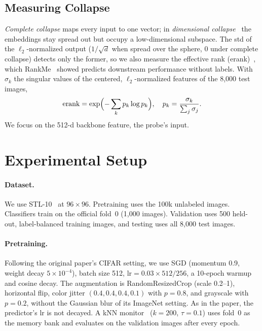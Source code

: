 \documentclass[10pt,twocolumn,letterpaper]{article}
\begin{document}
\subsection{Measuring Collapse}
\emph{Complete collapse} maps every input to one vector; in \emph{dimensional collapse}~\cite{hua2021feature,jing2022dimensional} the embeddings stay spread out but occupy a low-dimensional subspace.
The std of the $\ell_2$-normalized output ($1/\sqrt{d}$ when spread over the sphere, $0$ under complete collapse) detects only the former, so we also measure the effective rank (erank)~\cite{roy2007erank}, which RankMe~\cite{garrido2023rankme} showed predicts downstream performance without labels.
With $\sigma_k$ the singular values of the centered, $\ell_2$-normalized features of the 8,000 test images,
\begin{equation}
\text{erank}=\exp\Bigl(-\sum_k p_k\log p_k\Bigr),\quad p_k=\frac{\sigma_k}{\sum_j\sigma_j}.
\end{equation}
We focus on the 512-d backbone feature, the probe's input.

\section{Experimental Setup}
\label{sec:setup}

\paragraph{Dataset.}
We use STL-10~\cite{coates2011stl10} at $96\times96$. Pretraining uses the 100k unlabeled images.
Classifiers train on the official fold~0 (1,000 images). Validation uses 500 held-out, label-balanced training images, and testing uses all 8,000 test images.

\paragraph{Pretraining.}
Following the original paper's CIFAR setting, we use SGD (momentum 0.9, weight decay $5\!\times\!10^{-4}$), batch size 512, $\text{lr}=0.03\times512/256$, a 10-epoch warmup and cosine decay. The augmentation is RandomResizedCrop (scale 0.2--1), horizontal flip, color jitter $(0.4,0.4,0.4,0.1)$ with $p{=}0.8$, and grayscale with $p{=}0.2$, without the Gaussian blur of its ImageNet setting. As in the paper, the predictor's lr is not decayed.
A kNN monitor~\cite{wu2018instance} ($k{=}200$, $\tau{=}0.1$) uses fold~0 as the memory bank and evaluates on the validation images after every epoch.
\end{document}

